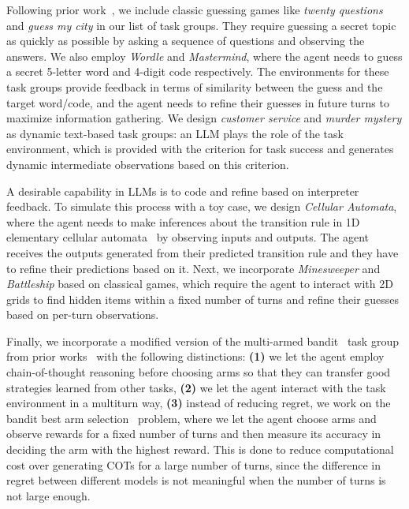 Following prior work~\citep{abdulhai2023lmrl}, we include classic guessing games like \textit{twenty questions} and \textit{guess my city} in our list of task groups. They require guessing a secret topic as quickly as possible by asking a sequence of questions and observing the answers. We also employ \textit{Wordle} and \textit{Mastermind}, where the agent needs to guess a secret 5-letter word and 4-digit code respectively. The environments for these task groups provide feedback in terms of similarity between the guess and the target word/code, and the agent needs to refine their guesses in future turns to maximize information gathering. We design \textit{customer service} and \textit{murder mystery} as dynamic text-based task groups: an LLM plays the role of the task environment, which is provided with the criterion for task success and generates dynamic intermediate observations based on this criterion. 

A desirable capability in LLMs is to code and refine based on interpreter feedback. To simulate this process with a toy case, we design \textit{Cellular Automata}, where the agent needs to make inferences about the transition rule in 1D elementary cellular automata~\citep{wolfram1983statistical, cook2004universality} by observing inputs and outputs. The agent receives the outputs generated from their predicted transition rule and they have to refine their predictions based on it. Next, we incorporate \textit{Minesweeper} and \textit{Battleship} based on classical games, which require the agent to interact with 2D grids to find hidden items within a fixed number of turns and refine their guesses based on per-turn observations. 

Finally, we incorporate a modified version of the multi-armed bandit~\citep{slivkins2024introductionmultiarmedbandits} task group from prior works~\citep{krishnamurthy2024largelanguagemodelsexplore,nie2024evolveevaluatingoptimizingllms} with the following distinctions: \textbf{(1)} we let the agent employ chain-of-thought reasoning before choosing arms so that they can transfer good strategies learned from other tasks, \textbf{(2)} we let the agent interact with the task environment in a multiturn way, \textbf{(3)} instead of reducing regret, we work on the bandit best arm selection~\citep{audibert:hal-00654404,wang2024bestarmidentificationfixed} problem, where we let the agent choose arms and observe rewards for a fixed number of turns and then measure its accuracy in deciding the arm with the highest reward. This is done to reduce computational cost over generating COTs for a large number of turns, since the difference in regret between different models is not meaningful when the number of turns is not large enough.
